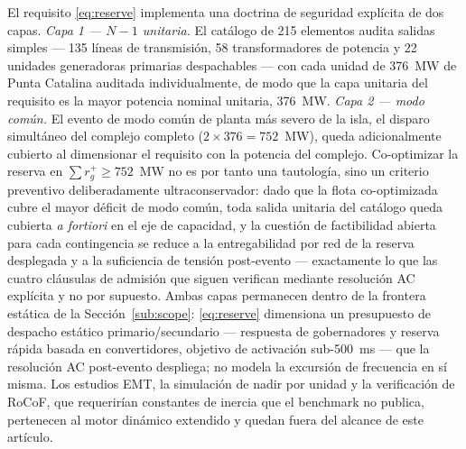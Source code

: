 El requisito \eqref{eq:reserve} implementa una doctrina de seguridad explícita de dos capas. \emph{Capa 1 --- $N-1$ unitaria.} El catálogo de 215 elementos audita salidas simples --- 135 líneas de transmisión, 58 transformadores de potencia y 22 unidades generadoras primarias despachables --- con cada unidad de 376~MW de Punta Catalina auditada individualmente, de modo que la capa unitaria del requisito es la mayor potencia nominal unitaria, 376~MW. \emph{Capa 2 --- modo común.} El evento de modo común de planta más severo de la isla, el disparo simultáneo del complejo completo ($2 \times 376 = 752$~MW), queda adicionalmente cubierto al dimensionar el requisito con la potencia del complejo. Co-optimizar la reserva en $\sum r_g^+ \ge 752$~MW no es por tanto una tautología, sino un criterio preventivo deliberadamente ultraconservador: dado que la flota co-optimizada cubre el mayor déficit de modo común, toda salida unitaria del catálogo queda cubierta \emph{a fortiori} en el eje de capacidad, y la cuestión de factibilidad abierta para cada contingencia se reduce a la entregabilidad por red de la reserva desplegada y a la suficiencia de tensión post-evento --- exactamente lo que las cuatro cláusulas de admisión que siguen verifican mediante resolución AC explícita y no por supuesto. Ambas capas permanecen dentro de la frontera estática de la Sección~\ref{sub:scope}: \eqref{eq:reserve} dimensiona un presupuesto de despacho estático primario/secundario --- respuesta de gobernadores y reserva rápida basada en convertidores, objetivo de activación sub-500~ms --- que la resolución AC post-evento despliega; no modela la excursión de frecuencia en sí misma. Los estudios EMT, la simulación de nadir por unidad y la verificación de RoCoF, que requerirían constantes de inercia que el benchmark no publica, pertenecen al motor dinámico extendido y quedan fuera del alcance de este artículo.

